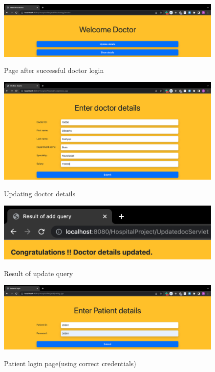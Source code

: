 \documentclass[12pt]{article}
\begin{document}
\vspace{15mm}

\begin{figure}[!hbt]
    \centering
    \includegraphics[scale=0.35]{screenshots/3b.png}
    \label{fig:data}
    \caption{Page after successful doctor login}
\end{figure}

\newpage

\begin{figure}[!hbt]
    \centering
    \includegraphics[scale=0.35]{screenshots/3c.png}
    \label{fig:my_label1}
    \caption{Updating doctor details}
\end{figure}

\vspace{15mm}

\begin{figure}[!hbt]
    \centering
    \includegraphics[scale=0.9]{screenshots/3d.png}
    \label{fig:data}
    \caption{Result of update query}
\end{figure}

\newpage

\begin{figure}[!hbt]
    \centering
    \includegraphics[scale=0.35]{screenshots/4a.png}
    \label{fig:my_label1}
    \caption{Patient login page(using correct credentials)}
\end{figure}
\end{document}
